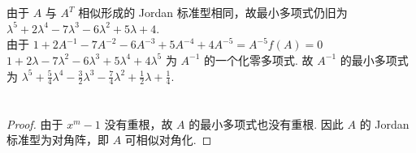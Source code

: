 \documentclass{article}
\begin{document}
\section{}

由于 $A$ 与 $A^T$ 相似形成的 Jordan 标准型相同，故最小多项式仍旧为 $\lambda^5 + 2\lambda^4 - 7\lambda^3 - 6\lambda^2 + 5\lambda + 4$. \\
由于 $1 + 2A^{-1} - 7A^{-2} - 6A^{-3} + 5A^{-4} + 4A^{-5} = A^{-5}f(A) = 0$ $1 + 2\lambda - 7\lambda^2 - 6\lambda^3 + 5\lambda^4 + 4\lambda^5$ 为 $A^{-1}$ 的一个化零多项式. 故 $A^{-1}$ 的最小多项式为 $\lambda^5 + \frac{5}{4}\lambda^4 - \frac{3}{2}\lambda^3 - \frac{7}{4}\lambda^2 + \frac{1}{2}\lambda + \frac{1}{4}$.

\section{}

\begin{proof}
    由于 $x^m - 1$ 没有重根，故 $A$ 的最小多项式也没有重根. 因此 $A$ 的 Jordan 标准型为对角阵，即 $A$ 可相似对角化.
\end{proof}
\end{document}
